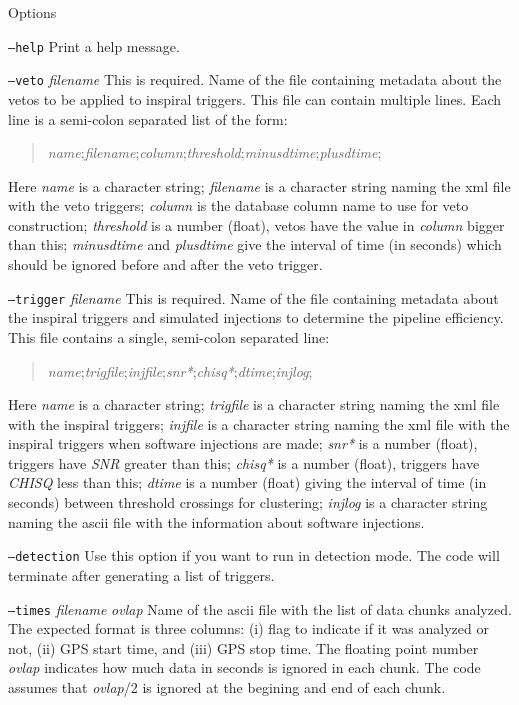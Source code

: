 \begin{entry}
\item[Options]\leavevmode
\begin{entry}
\item[\texttt{--help}]
Print a help message.
\item[\texttt{--veto} \textit{filename}]
This is required. 
Name of the file containing metadata about the vetos to be applied to
inspiral triggers.   This file can contain multiple lines.  Each line
is a semi-colon separated list of the form:
\begin{quote}
\textit{name};\textit{filename};\textit{column};\textit{threshold};\textit{minusdtime};\textit{plusdtime};
\end{quote}
Here \textit{name} is a character string;  \textit{filename} is a
character string naming the xml file with the veto triggers;
\textit{column} is the database column name to use for veto
construction;  \textit{threshold} is a number (float),  vetos have the
value in \textit{column} bigger than this;  \textit{minusdtime} and 
\textit{plusdtime} give the interval of time (in seconds) which should
be ignored before and after the veto trigger.
\item[\texttt{--trigger} \textit{filename}]
This is required. 
Name of the file containing metadata about the inspiral triggers and
simulated injections to determine the pipeline efficiency.    This file 
contains a single, semi-colon separated line:  
\begin{quote}
\textit{name};\textit{trigfile};\textit{injfile};\textit{snr*};\textit{chisq*};\textit{dtime};\textit{injlog};
\end{quote}
Here \textit{name} is a character string;  \textit{trigfile} is a
character string naming the xml file with the inspiral triggers;
\textit{injfile} is a character string naming the xml file with the
inspiral triggers when software injections are made; \textit{snr*} is
a number (float),  triggers have \textit{SNR} greater than this;
\textit{chisq*} is a number (float),  triggers have \textit{CHISQ}
less than this; \textit{dtime} is a number (float) giving the interval
of time (in seconds) between threshold crossings for clustering;
\textit{injlog} is a character string naming the ascii file with the
information about software injections.  
\item[\texttt{--detection}] Use this option if you want to run in
detection mode.  The code will terminate after generating a list of
triggers.  
\item[\texttt{--times} \textit{filename} \textit{ovlap}]
Name of the ascii file with the list of data chunks analyzed.   The
expected format is three columns:  (i) flag to indicate if it was
analyzed or not,  (ii) GPS start time, and (iii) GPS stop time.  The
floating point number \textit{ovlap} indicates how much data in
seconds is ignored in each
chunk.   The code assumes that \textit{ovlap}/2 is ignored at the
begining and end of each chunk.
\end{entry}



\end{entry}
